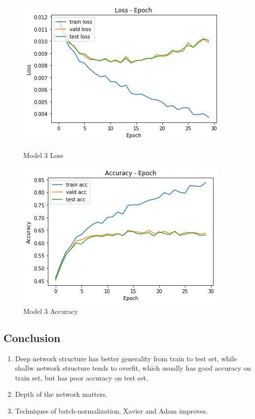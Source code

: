 \documentclass{article}
\begin{document}
\begin{figure}[h]
\begin{minipage}{0.48\textwidth}
\centering
\includegraphics[width=\textwidth]{pics/t_loss.png}
\caption{Model 3 Loss}
\end{minipage}
\hfill
\begin{minipage}{0.48\textwidth}
\centering
\includegraphics[width=\textwidth]{pics/t_acc.png}
\caption{Model 3 Accuracy}
\end{minipage}
\end{figure}
\subsection{Conclusion}
\begin{enumerate}
\item Deep network structure has better generality from train to test set, while shallw network structure tends to overfit, which usually has good accuracy on train set, but has poor accuracy on test set.
\item Depth of the network matters.
\item Techniques of batch-normalization, Xavier and Adam improves.

\end{enumerate}
\end{document}

